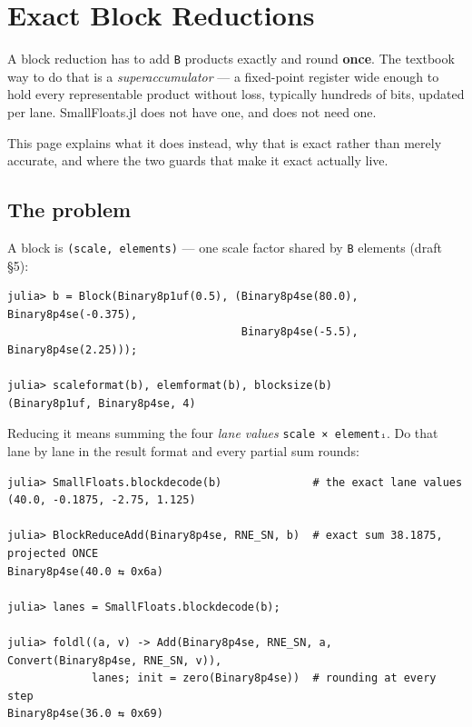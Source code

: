 \section{Exact Block Reductions}



\label{2063875876080915467}{}


A block reduction has to add \texttt{B} products exactly and round \textbf{once}. The textbook way to do that is a \emph{superaccumulator} — a fixed-point register wide enough to hold every representable product without loss, typically hundreds of bits, updated per lane. SmallFloats.jl does not have one, and does not need one.



This page explains what it does instead, why that is exact rather than merely accurate, and where the two guards that make it exact actually live.



\subsection{The problem}



\label{8110874124300025953}{}


A block is \texttt{(scale, elements)} — one scale factor shared by \texttt{B} elements (draft §5):




\nopagebreak[4]
\begin{verbatim}
julia> b = Block(Binary8p1uf(0.5), (Binary8p4se(80.0), Binary8p4se(-0.375),
                                    Binary8p4se(-5.5), Binary8p4se(2.25)));

julia> scaleformat(b), elemformat(b), blocksize(b)
(Binary8p1uf, Binary8p4se, 4)
\end{verbatim}



Reducing it means summing the four \emph{lane values} \texttt{scale × elementᵢ}. Do that lane by lane in the result format and every partial sum rounds:




\nopagebreak[4]
\begin{verbatim}
julia> SmallFloats.blockdecode(b)              # the exact lane values
(40.0, -0.1875, -2.75, 1.125)

julia> BlockReduceAdd(Binary8p4se, RNE_SN, b)  # exact sum 38.1875, projected ONCE
Binary8p4se(40.0 ⇆ 0x6a)

julia> lanes = SmallFloats.blockdecode(b);

julia> foldl((a, v) -> Add(Binary8p4se, RNE_SN, a, Convert(Binary8p4se, RNE_SN, v)),
             lanes; init = zero(Binary8p4se))  # rounding at every step
Binary8p4se(36.0 ⇆ 0x69)
\end{verbatim}



